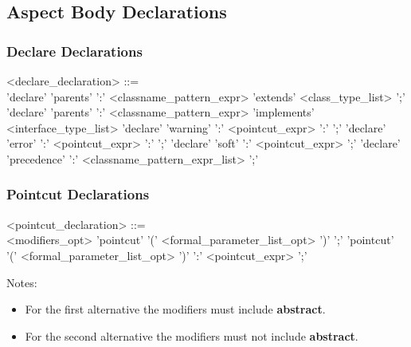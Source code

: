 \subsection{Aspect Body Declarations}

\subsubsection{Declare Declarations}

\begin{minipage}{6in}
\begin{grammar}
<declare_declaration> ::= \hspace{1in} \\
       'declare' 'parents' ':' {\blue <classname_pattern_expr>} 'extends' 
           {\red <class_type_list>} ';' 
\alt   'declare' 'parents' ':' {\blue <classname_pattern_expr>} 'implements'
           {\red <interface_type_list>}
\alt   'declare' 'warning' ':' {\blue <pointcut_expr>} ':'
                                            {} ';'
\alt   'declare' 'error' ':' {\blue <pointcut_expr>} ':' 
                                            {} ';'
\alt   'declare' 'soft' ':' {\blue <pointcut_expr>} ';'
\alt   'declare' 'precedence' ':' {\blue <classname_pattern_expr_list>} ';'
\end{grammar}
\end{minipage}

\subsubsection{Pointcut Declarations}

\begin{minipage}{6in}
\begin{grammar}
<pointcut_declaration> ::= \hspace{1in} \\
      {\red <modifiers_opt>} 'pointcut' {} 
             '(' {\red <formal_parameter_list_opt>} ')' ';'
 'pointcut' {} 
             '(' {\red <formal_parameter_list_opt>} ')' 
             ':' {\blue <pointcut_expr>} ';'
\end{grammar}
\end{minipage}

\noindent Notes:
\begin{itemize}
\item For the first alternative the modifiers must include {\bf abstract}.
\item For the second alternative the modifiers must not include {\bf abstract}.
\end{itemize}

